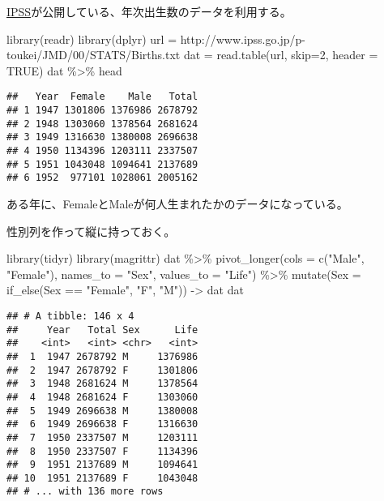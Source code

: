 \documentclass[
]{book}
\newenvironment{Shaded}{\begin{snugshade}}{\end{snugshade}}
\newcommand{\AttributeTok}[1]{\textcolor[rgb]{0.77,0.63,0.00}{#1}}
\newcommand{\ConstantTok}[1]{\textcolor[rgb]{0.00,0.00,0.00}{#1}}
\newcommand{\DecValTok}[1]{\textcolor[rgb]{0.00,0.00,0.81}{#1}}
\newcommand{\FunctionTok}[1]{\textcolor[rgb]{0.00,0.00,0.00}{#1}}
\newcommand{\NormalTok}[1]{#1}
\newcommand{\OtherTok}[1]{\textcolor[rgb]{0.56,0.35,0.01}{#1}}
\newcommand{\SpecialCharTok}[1]{\textcolor[rgb]{0.00,0.00,0.00}{#1}}
\newcommand{\StringTok}[1]{\textcolor[rgb]{0.31,0.60,0.02}{#1}}
\begin{document}
\href{http://www.ipss.go.jp/}{IPSS}が公開している、年次出生数のデータを利用する。

\begin{Shaded}
\begin{Highlighting}[]
\FunctionTok{library}\NormalTok{(readr)}
\FunctionTok{library}\NormalTok{(dplyr)}
\NormalTok{url }\OtherTok{=} \StringTok{\textquotesingle{}http://www.ipss.go.jp/p{-}toukei/JMD/00/STATS/Births.txt\textquotesingle{}}
\NormalTok{dat }\OtherTok{=} \FunctionTok{read.table}\NormalTok{(url, }\AttributeTok{skip=}\DecValTok{2}\NormalTok{, }\AttributeTok{header =} \ConstantTok{TRUE}\NormalTok{)}
\NormalTok{dat }\SpecialCharTok{\%\textgreater{}\%}\NormalTok{ head}
\end{Highlighting}
\end{Shaded}

\begin{verbatim}
##   Year  Female    Male   Total
## 1 1947 1301806 1376986 2678792
## 2 1948 1303060 1378564 2681624
## 3 1949 1316630 1380008 2696638
## 4 1950 1134396 1203111 2337507
## 5 1951 1043048 1094641 2137689
## 6 1952  977101 1028061 2005162
\end{verbatim}

ある年に、FemaleとMaleが何人生まれたかのデータになっている。

性別列を作って縦に持っておく。

\begin{Shaded}
\begin{Highlighting}[]
\FunctionTok{library}\NormalTok{(tidyr)}
\FunctionTok{library}\NormalTok{(magrittr)}
\NormalTok{dat }\SpecialCharTok{\%\textgreater{}\%}  
        \FunctionTok{pivot\_longer}\NormalTok{(}\AttributeTok{cols =} \FunctionTok{c}\NormalTok{(}\StringTok{"Male"}\NormalTok{, }\StringTok{"Female"}\NormalTok{), }\AttributeTok{names\_to =} \StringTok{"Sex"}\NormalTok{, }\AttributeTok{values\_to =} \StringTok{"Life"}\NormalTok{) }\SpecialCharTok{\%\textgreater{}\%} 
        \FunctionTok{mutate}\NormalTok{(}\AttributeTok{Sex =} \FunctionTok{if\_else}\NormalTok{(Sex }\SpecialCharTok{==} \StringTok{"Female"}\NormalTok{, }\StringTok{"F"}\NormalTok{, }\StringTok{"M"}\NormalTok{)) }\OtherTok{{-}\textgreater{}}\NormalTok{ dat}
\NormalTok{dat}
\end{Highlighting}
\end{Shaded}

\begin{verbatim}
## # A tibble: 146 x 4
##     Year   Total Sex      Life
##    <int>   <int> <chr>   <int>
##  1  1947 2678792 M     1376986
##  2  1947 2678792 F     1301806
##  3  1948 2681624 M     1378564
##  4  1948 2681624 F     1303060
##  5  1949 2696638 M     1380008
##  6  1949 2696638 F     1316630
##  7  1950 2337507 M     1203111
##  8  1950 2337507 F     1134396
##  9  1951 2137689 M     1094641
## 10  1951 2137689 F     1043048
## # ... with 136 more rows
\end{verbatim}
\end{document}
